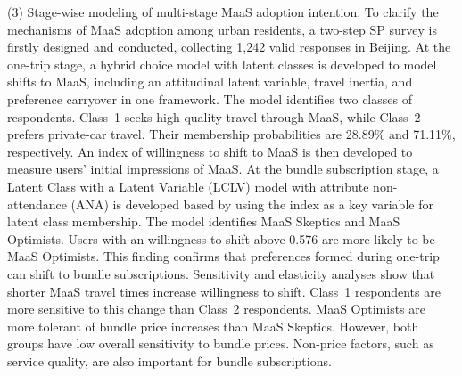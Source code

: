 \begin{englishabstract}
(3) Stage-wise modeling of multi-stage MaaS adoption intention. To clarify the mechanisms of MaaS adoption among urban residents, a two-step SP survey is firstly designed and conducted, collecting 1,242 valid responses in Beijing. At the one-trip stage, a hybrid choice model with latent classes is developed to model shifts to MaaS, including an attitudinal latent variable, travel inertia, and preference carryover in one framework. The model identifies two classes of respondents. Class~1 seeks high-quality travel through MaaS, while Class~2 prefers private-car travel. Their membership probabilities are 28.89\% and 71.11\%, respectively. An index of willingness to shift to MaaS is then developed to measure users' initial impressions of MaaS. At the bundle subscription stage, a Latent Class with a Latent Variable (LCLV) model with attribute non-attendance (ANA) is developed based by using the index as a key variable for latent class membership. The model identifies MaaS Skeptics and MaaS Optimists. Users with an willingness to shift above 0.576 are more likely to be MaaS Optimists. This finding confirms that preferences formed during one-trip can shift to bundle subscriptions. Sensitivity and elasticity analyses show that shorter MaaS travel times increase willingness to shift. Class~1 respondents are more sensitive to this change than Class~2 respondents. MaaS Optimists are more tolerant of bundle price increases than MaaS Skeptics. However, both groups have low overall sensitivity to bundle prices. Non-price factors, such as service quality, are also important for bundle subscriptions.


\end{englishabstract}
